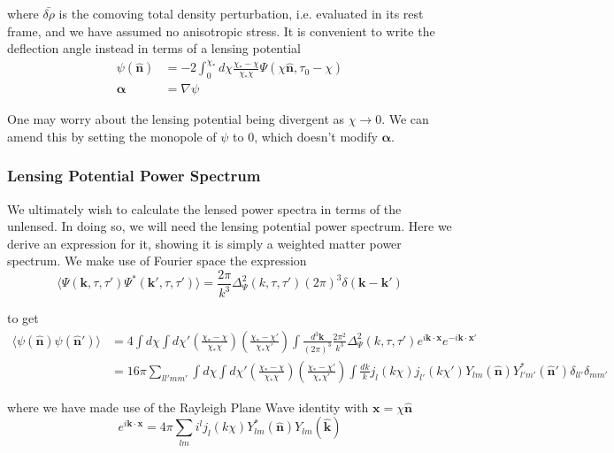 \documentclass[a4paper,10pt]{article}
\renewcommand{\v}[1]{\mathbf{#1}}
\newcommand{\fint}[1]{\int \frac{d^3 \v{#1}}{(2\pi)^3}}
\newcommand{\unit}[1]{\hat{\v{#1}}}
\begin{document}
where $\bar{\delta\rho}$ is the comoving total density perturbation, i.e. evaluated in its rest frame, and we have assumed no anisotropic stress. It is convenient to write the deflection angle instead in terms of a lensing potential
\begin{equation}\begin{split}
\psi(\unit{n}) &= -2 \int_0^{\chi_*}d\chi \frac{\chi_*-\chi}{\chi_*\chi}\Psi(\chi\unit{n},\tau_0-\chi)\\
\v{\alpha} &= \nabla \psi
\end{split}\end{equation}

One may worry about the lensing potential being divergent as $\chi \rightarrow 0$. We can amend this by setting the monopole of $\psi$ to 0, which doesn't modify $\v{\alpha}$. 

\subsubsection{Lensing Potential Power Spectrum}

We ultimately wish to calculate the lensed power spectra in terms of the unlensed. In doing so, we will need the lensing potential power spectrum. Here we derive an expression for it, showing it is simply a weighted matter power spectrum. We make use of Fourier space the expression
\begin{equation}
\langle \Psi(\v{k},\tau,\tau')\Psi^*(\v{k}',\tau,\tau')\rangle=\frac{2\pi}{k^3}\Delta^2_\Psi(k,\tau,\tau')(2\pi)^3\delta(\v{k}-\v{k}')
\end{equation}

to get 
\begin{equation}\begin{split}
\langle \psi(\unit{n})\psi(\unit{n}') \rangle &= 4\int d\chi \int d\chi'(\frac{\chi_*-\chi}{\chi_*\chi})(\frac{\chi_*-\chi'}{\chi_*\chi'})\fint{k}\frac{2\pi^2}{k^3}\Delta^2_\Psi(k,\tau,\tau')e^{i\v{k}\cdot\v{x}}e^{-i\v{k}\cdot\v{x'}}\\
&= 16\pi \sum_{ll'mm'}\int d\chi \int d\chi'(\frac{\chi_*-\chi}{\chi_*\chi})(\frac{\chi_*-\chi'}{\chi_*\chi'})\int \frac{dk}{k}j_l(k\chi)j_{l'}(k\chi')Y_{lm}(\unit{n})Y^*_{l'm'}(\unit{n}')\delta_{ll'}\delta_{mm'}
\end{split}\end{equation}

where we have made use of the Rayleigh Plane Wave identity with $\v{x}=\chi\unit{n}$
\begin{equation}
e^{i\v{k}\cdot\v{x}} = 4\pi\sum_{lm}i^lj_l(k\chi)Y_{lm}^*(\unit{n})Y_{lm}(\unit{k})
\end{equation}
\end{document}
